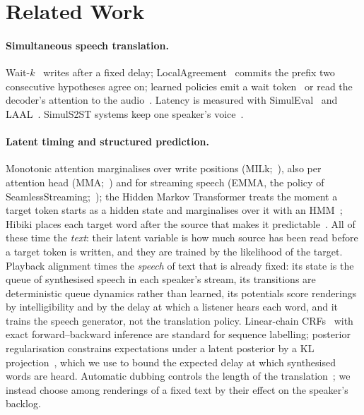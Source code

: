 \section{Related Work}
\label{sec:related}

\paragraph{Simultaneous speech translation.} Wait-$k$~\citep{ma2019stacl} writes after a fixed delay;
LocalAgreement~\citep{liu2020low,polak2022cuni,machacek2023turning} commits the prefix two consecutive hypotheses agree
on; learned policies emit a wait token~\citep{koshkin2024transllama} or read the decoder's attention to the
audio~\citep{papi2023edatt,papi2024streamatt}. Latency is measured with SimulEval~\citep{ma2020simuleval} and
LAAL~\citep{papi2022over}. SimulS2ST systems
keep one speaker's voice~\citep{zhang2024streamspeech,seamless2023,labiausse2025hibiki,cheng2025liveinterpret,he2026simuls2st,deng2025simuls2s}.

\paragraph{Latent timing and structured prediction.} Monotonic attention marginalises over write positions
(MILk;~\citealp{arivazhagan2019milk}), also per attention head (MMA;~\citealp{ma2020mma}) and for streaming speech
(EMMA, the policy of SeamlessStreaming;~\citealp{ma2023emma}); the Hidden Markov Transformer treats the moment a target
token starts as a hidden state and marginalises over it with an HMM~\citep{zhang2023hmt}; Hibiki places each target
word after the source that makes it predictable~\citep{labiausse2025hibiki}. All of these time the \emph{text}: their
latent variable is how much source has been read before a target token is written, and they are trained by the
likelihood of the target. Playback alignment times the \emph{speech} of text that is already fixed: its state is the
queue of synthesised speech in each speaker's stream, its transitions are deterministic queue dynamics rather than
learned, its potentials score renderings by intelligibility and by the delay at which a listener hears each word, and
it trains the speech generator, not the translation policy. Linear-chain CRFs~\citep{lafferty2001crf} with exact
forward--backward inference are standard for sequence labelling; posterior regularisation constrains expectations under
a latent posterior by a KL projection~\citep{ganchev2010posterior}, which we use to bound the expected delay at which
synthesised words are heard. Automatic dubbing controls the length of the translation~\citep{lakew2022isometric}; we
instead choose among renderings of a fixed text by their effect on the speaker's backlog.

